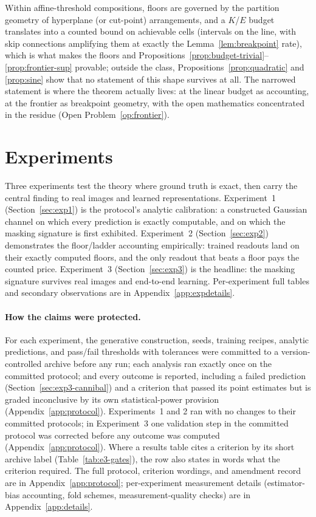 \documentclass[twocolumn,10pt]{article}
\theoremstyle{definition}
\theoremstyle{remark}
\begin{document}
Within affine-threshold compositions, floors are governed by the
partition geometry of hyperplane (or cut-point) arrangements, and a
$K$/$E$ budget translates into a counted bound on achievable cells
(intervals on the line, with skip connections amplifying them at
exactly the Lemma~\ref{lem:breakpoint} rate), which is what makes
the floors and
Propositions~\ref{prop:budget-trivial}--\ref{prop:frontier-sup}
provable; outside the class, Propositions~\ref{prop:quadratic} and
\ref{prop:sine} show that no statement of this shape survives at all.
The narrowed statement is where the theorem actually lives: at the
linear budget as accounting, at the frontier as breakpoint geometry,
with the open mathematics concentrated in the residue
(Open Problem~\ref{op:frontier}).

\section{Experiments}
\label{sec:experiments}

Three experiments test the theory where ground truth is exact, then
carry the central finding to real images and learned representations.
Experiment~1 (Section~\ref{sec:exp1}) is the protocol's analytic
calibration: a constructed Gaussian channel on which every prediction
is exactly computable, and on which the masking signature is first
exhibited. Experiment~2 (Section~\ref{sec:exp2}) demonstrates the
floor/ladder accounting empirically: trained readouts land on their
exactly computed floors, and the only readout that beats a floor pays
the counted price. Experiment~3 (Section~\ref{sec:exp3}) is the
headline: the masking signature survives real images and end-to-end
learning. Per-experiment full tables and secondary observations are
in Appendix~\ref{app:expdetails}.

\paragraph{How the claims were protected.} For each experiment, the
generative construction, seeds, training recipes, analytic
predictions, and pass/fail thresholds with tolerances were committed
to a version-controlled archive before any run; each analysis ran
exactly once on the committed protocol; and every outcome is reported,
including a failed prediction (Section~\ref{sec:exp3-cannibal}) and a
criterion that passed its point estimates but is graded inconclusive
by its own statistical-power provision (Appendix~\ref{app:protocol}).
Experiments~1 and 2 ran with no changes to their committed protocols;
in Experiment~3 one validation step in the committed protocol was
corrected before any outcome was computed (Appendix~\ref{app:protocol}).
Where a results table cites a criterion by its short archive label
(Table~\ref{tab:e3-gates}), the row also states in words what the
criterion required. The full protocol, criterion wordings, and
amendment record are in Appendix~\ref{app:protocol}; per-experiment
measurement details (estimator-bias accounting, fold schemes,
measurement-quality checks) are in Appendix~\ref{app:details}.
\end{document}
